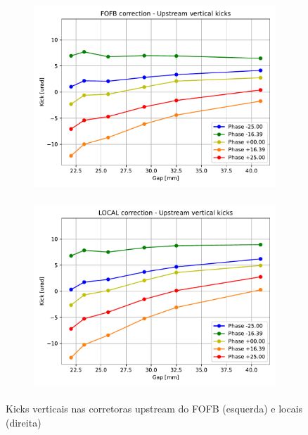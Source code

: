 \documentclass[a4paper,12pt]{article}
\begin{document}
\begin{figure}[H]
\begin{subfigure}{0.5\textwidth}
\includegraphics[width=0.9\linewidth, height=7cm]{figs/FOFB-up-kicky.pdf} 
\label{fig:subimfofbupy}
\end{subfigure}
\begin{subfigure}{0.5\textwidth}
\includegraphics[width=0.9\linewidth, height=7cm]{figs/LOCAL-up-kicky.pdf}
\label{fig:subimlocalupy}
\end{subfigure}
\caption{Kicks verticais nas corretoras upstream do FOFB (esquerda) e locais (direita)}
\label{fig:upy}
\end{figure}
\end{document}
